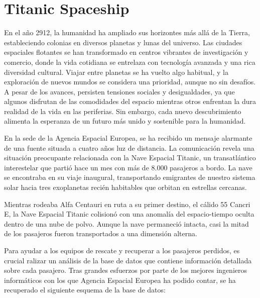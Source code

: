 \documentclass{db-practice}
\begin{document}
\begin{enumerate}
\end{enumerate}

\section{Titanic Spaceship}

En el año 2912, la humanidad ha ampliado sus horizontes más allá de la Tierra, estableciendo colonias en diversos planetas y lunas del universo. Las ciudades espaciales flotantes se han transformado en centros vibrantes de investigación y comercio, donde la vida cotidiana se entrelaza con tecnología avanzada y una rica diversidad cultural. Viajar entre planetas se ha vuelto algo habitual, y la exploración de nuevos mundos se considera una prioridad, aunque no sin desafíos. A pesar de los avances, persisten tensiones sociales y desigualdades, ya que algunos disfrutan de las comodidades del espacio mientras otros enfrentan la dura realidad de la vida en las periferias. Sin embargo, cada nuevo descubrimiento alimenta la esperanza de un futuro más unido y sostenible para la humanidad.

En la sede de la Agencia Espacial Europea, se ha recibido un mensaje alarmante de una fuente situada a cuatro años luz de distancia. La comunicación revela una situación preocupante relacionada con la Nave Espacial Titanic, un transatlántico interestelar que partió hace un mes con más de 8.000 pasajeros a bordo. La nave se encontraba en su viaje inaugural, transportando emigrantes de nuestro sistema solar hacia tres exoplanetas recién habitables que orbitan en estrellas cercanas.

Mientras rodeaba Alfa Centauri en ruta a su primer destino, el cálido 55 Cancri E, la Nave Espacial Titanic colisionó con una anomalía del espacio-tiempo oculta dentro de una nube de polvo. Aunque la nave permaneció intacta, casi la mitad de los pasajeros fueron transportados a una dimensión alterna.

Para ayudar a los equipos de rescate y recuperar a los pasajeros perdidos, es crucial ralizar un análisis de la base de datos que contiene información detallada sobre cada pasajero. Tras grandes esfuerzos por parte de los mejores ingenieros informáticos con los que Agencia Espacial Europea ha podido contar, se ha recuperado el siguiente esquema de la base de datos:
\end{document}
